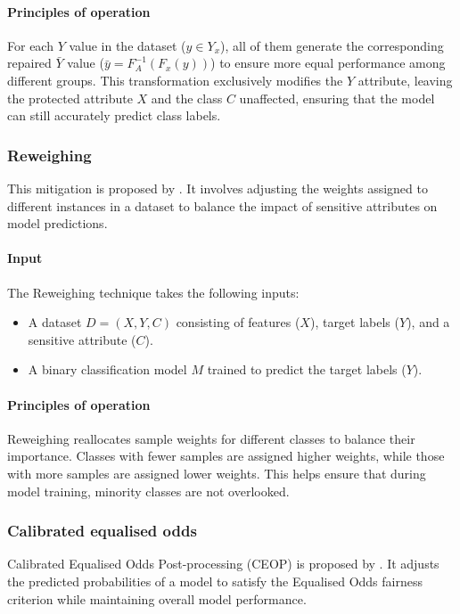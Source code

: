 \documentclass[runningheads]{llncs}
\begin{document}
\paragraph{Principles of operation} For each \(Y\) value in the
dataset (\(y \in Y_x\)), all of them generate the corresponding
repaired \(\bar{Y}\) value (\(\bar{y} = F^{-1}_A(F_x(y))\)) to ensure
more equal performance among different groups. This transformation
exclusively modifies the \(Y\) attribute, leaving the protected
attribute \(X\) and the class \(C\) unaffected, ensuring that the
model can still accurately predict class labels.

\subsubsection{Reweighing}
This mitigation is proposed by \cite{kamiran2012data}. It involves
adjusting the weights assigned to different instances in a dataset to
balance the impact of sensitive attributes on model predictions.

\paragraph{Input} The Reweighing technique takes the following inputs:
\begin{itemize}
\item A dataset $D = (X, Y, C)$ consisting of features ($X$), target
    labels ($Y$), and a sensitive attribute ($C$).
\item A binary classification model $M$ trained to predict the target
    labels ($Y$).
\end{itemize}

\paragraph{Principles of operation} Reweighing reallocates sample
weights for different classes to balance their importance. Classes
with fewer samples are assigned higher weights, while those with more
samples are assigned lower weights. This helps ensure that during
model training, minority classes are not overlooked.

\subsubsection{Calibrated equalised odds}
Calibrated Equalised Odds Post-processing (CEOP) is proposed by
\cite{pleiss2017fairness}. It adjusts the predicted probabilities of a
model to satisfy the Equalised Odds fairness criterion while
maintaining overall model performance.
\end{document}
